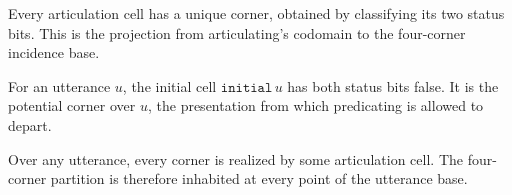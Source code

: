 \begin{proposition}\label{thm:articulation-cell-corner}\leanok{}
Every articulation cell has a unique corner, obtained by classifying its two
status bits. This is the projection from articulating's codomain to the
four-corner incidence base.
\end{proposition}

\begin{proposition}\label{thm:articulation-cell-initial}\leanok{}
For an utterance $u$, the initial cell $\texttt{initial}\,u$ has both status
bits false. It is the potential corner over $u$, the presentation from which
predicating is allowed to depart.
\end{proposition}

\begin{proposition}\label{thm:corner-surjective}\leanok{}
Over any utterance, every corner is realized by some articulation cell. The
four-corner partition is therefore inhabited at every point of the utterance
base.
\end{proposition}
